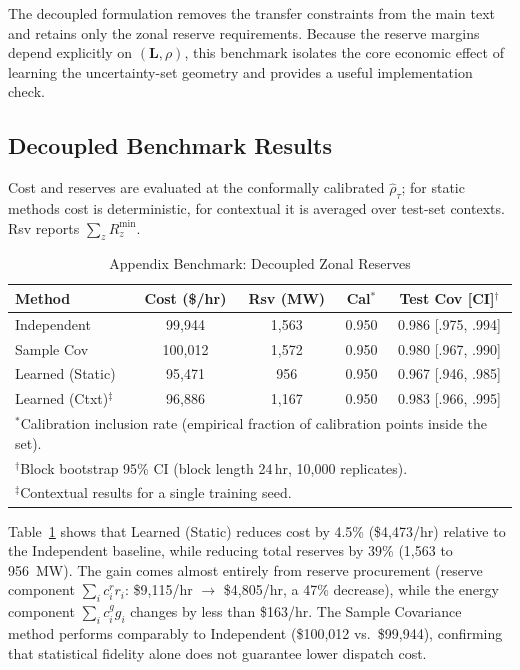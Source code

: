 \documentclass[11pt]{article}
\newcommand{\bL}{\bm{L}}
\theoremstyle{definition}
\begin{document}
The decoupled formulation removes the transfer constraints from the main text and retains only the zonal reserve requirements. Because the reserve margins depend explicitly on $(\bL,\rho)$, this benchmark isolates the core economic effect of learning the uncertainty-set geometry and provides a useful implementation check.

\subsection{Decoupled Benchmark Results}

Cost and reserves are evaluated at the conformally calibrated $\hat{\rho}_\tau$; for static methods cost is deterministic, for contextual it is averaged over test-set contexts. Rsv reports $\sum_z R_z^{\min}$.

\begin{table}[!t]
\caption{Appendix Benchmark: Decoupled Zonal Reserves}
\label{tab:decoupled}
\centering\footnotesize\setlength{\tabcolsep}{4pt}
\begin{tabular}{lcccc}
\toprule
\textbf{Method} & \textbf{Cost (\$/hr)} & \textbf{Rsv (MW)} & \textbf{Cal$^*$} & \textbf{Test Cov [CI]$^\dagger$} \\
\midrule
Independent & 99{,}944 & 1{,}563 & 0.950 & 0.986 [.975, .994] \\
Sample Cov & 100{,}012 & 1{,}572 & 0.950 & 0.980 [.967, .990] \\
Learned (Static) & 95{,}471 & 956 & 0.950 & 0.967 [.946, .985] \\
Learned (Ctxt)$^\ddagger$ & 96{,}886 & 1{,}167 & 0.950 & 0.983 [.966, .995] \\
\bottomrule
\multicolumn{5}{l}{\footnotesize $^*$Calibration inclusion rate (empirical fraction of calibration points inside the set).} \\
\multicolumn{5}{l}{\footnotesize $^\dagger$Block bootstrap 95\% CI (block length 24\,hr, 10{,}000 replicates).} \\
\multicolumn{5}{l}{\footnotesize $^\ddagger$Contextual results for a single training seed.}
\end{tabular}
\end{table}

Table~\ref{tab:decoupled} shows that Learned (Static) reduces cost by 4.5\% (\$4{,}473/hr) relative to the Independent baseline, while reducing total reserves by 39\% (1{,}563 to 956~MW). The gain comes almost entirely from reserve procurement (reserve component $\sum_i c_i^r r_i$: \$9{,}115/hr $\to$ \$4{,}805/hr, a 47\% decrease), while the energy component $\sum_i c_i^g g_i$ changes by less than \$163/hr. The Sample Covariance method performs comparably to Independent (\$100{,}012 vs.\ \$99{,}944), confirming that statistical fidelity alone does not guarantee lower dispatch cost.
\end{document}
